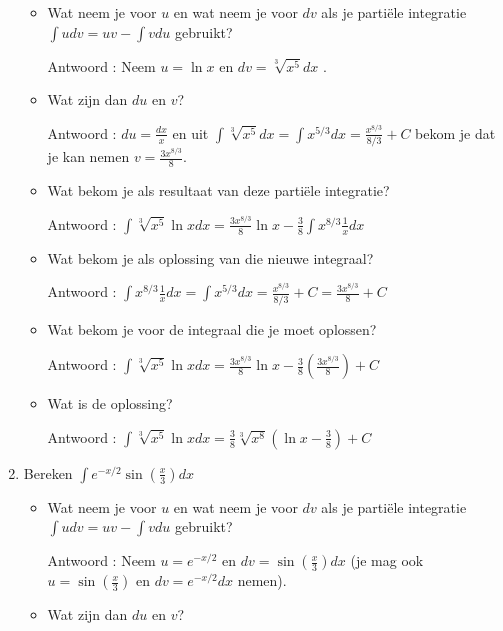 \documentclass{article}
\begin{document}
\begin{enumerate}
\begin{itemize}

\item Wat neem je voor $u$ en wat neem je voor $dv$ als je parti\"ele integratie $\int udv = uv -\int vdu$ gebruikt?

Antwoord : Neem $u= \ln x$ en $dv=\sqrt[3]{x^5}dx$ .

\item Wat zijn dan $du$ en $v$?

Antwoord : $du=\frac{dx}{x}$ en uit $\int \sqrt[3]{x^5}dx=\int x^{5/3}dx=\frac{x^{8/3}}{8/3}+C$ bekom je dat je kan nemen $v=\frac{3x^{8/3}}{8}$.

\item Wat bekom je als resultaat van deze parti\"ele integratie?

Antwoord : $\int \sqrt[3]{x^5} \ln x dx=\frac{3x^{8/3}}{8} \ln x-\frac{3}{8}\int x^{8/3}\frac{1}{x}dx$

\item Wat bekom je als oplossing van die nieuwe integraal?

Antwoord : $\int x^{8/3}\frac{1}{x}dx=\int x^{5/3}dx=\frac{x^{8/3}}{8/3}+C=\frac{3x^{8/3}}{8}+C$

\item Wat bekom je voor de integraal die je moet oplossen?

Antwoord :  $\int \sqrt[3]{x^5} \ln x dx=\frac{3x^{8/3}}{8} \ln x-\frac{3}{8}\left( \frac{3x^{8/3}}{8}  \right)+C$

\item Wat is de oplossing?

Antwoord :  $\int \sqrt[3]{x^5} \ln x dx= \frac{3}{8} \sqrt[3]{x^8} \left( \ln x -\frac {3}{8}  \right) +C$

\end{itemize}

\item Bereken $\int e^{-x/2}\sin \left( \frac{x}{3}  \right)dx$

\begin{itemize}

\item Wat neem je voor $u$ en wat neem je voor $dv$ als je parti\"ele integratie $\int udv = uv -\int vdu$ gebruikt?

Antwoord : Neem $u=e^{-x/2}$ en $dv=\sin \left( \frac{x}{3}  \right)dx$ (je mag ook $u=\sin \left( \frac{x}{3}  \right)$ en $dv=e^{-x/2}dx$ nemen).

\item Wat zijn dan $du$ en $v$?


\end{itemize}
\end{enumerate}
\end{document}
